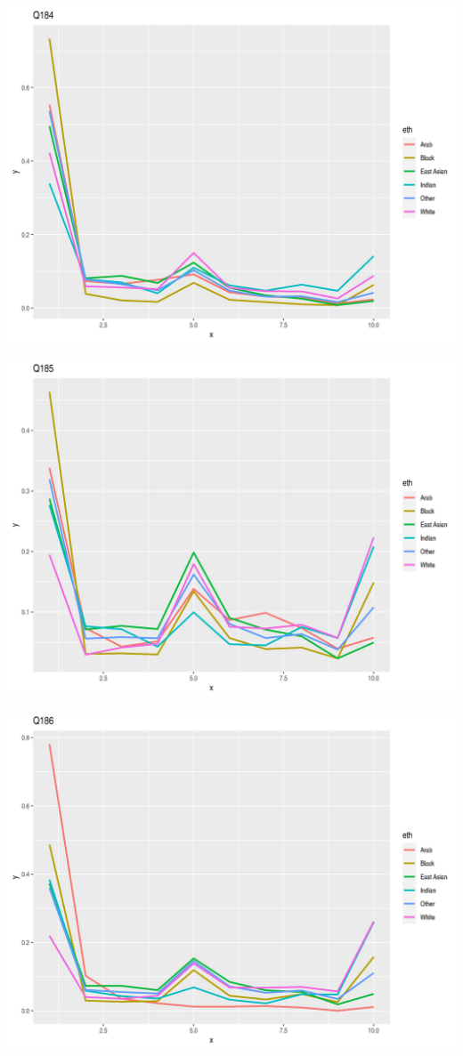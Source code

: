 \documentclass{amsart}
\begin{document}
\includegraphics[scale=0.7]{q184.jpeg}

\includegraphics[scale=0.7]{q185.jpeg}

\includegraphics[scale=0.7]{q186.jpeg}
\end{document}
